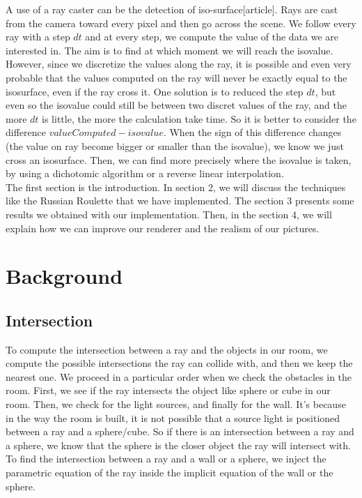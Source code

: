 \documentclass[12pt]{article}
\numberwithin{equation}{section}
\begin{document}
A use of a ray caster can be the detection of iso-surface[article]. Rays are cast from the camera toward every pixel and then go across the scene. We follow every ray with a step $dt$ and at every step, we compute the value of the data we are interested in. The aim is to find at which moment we will reach the isovalue. However, since we discretize the values along the ray, it is possible and even very probable that the values computed on the ray will never be exactly equal to the isosurface, even if the ray cross it. One solution is to reduced the step $dt$, but even so the isovalue could still be between two discret values of the ray, and the more $dt$ is little, the more the calculation take time. So it is better to consider the difference $valueComputed - isovalue$. When the sign of this difference changes (the value on ray become bigger or smaller than the isovalue), we know we just cross an isosurface. Then, we can find more precisely where the isovalue is taken, by using a dichotomic algorithm or a reverse linear interpolation.\\

The first section is the introduction. In section 2, we will discuss the techniques like the Russian Roulette that we have implemented. The section 3 presents some results we obtained with our implementation. Then, in the section 4, we will explain how we can improve our renderer and the realism of our pictures. 

\section{Background}

\subsection{Intersection}
To compute the intersection between a ray and the objects in our room, we compute the possible intersections the ray can collide with, and then we keep the nearest one. We proceed in a particular order when we check the obstacles in the room. First, we see if the ray intersects the object like sphere or cube in our room. Then, we check for the light sources, and finally for the wall. It's because in the way the room is built, it is not possible that a source light is positioned between a ray and a sphere/cube. So if there is an intersection between a ray and a sphere, we know that the sphere is the closer object the ray will intersect with. To find the intersection between a ray and a wall or a sphere, we inject the parametric equation of the ray inside the implicit equation of the wall or the sphere.\\
\end{document}
